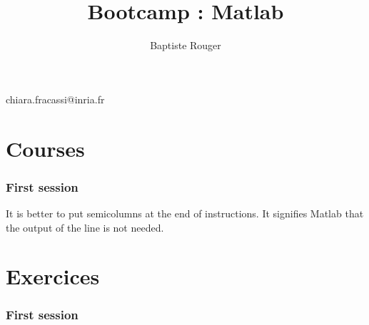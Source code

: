 \documentclass[10pt,a4paper]{article}
\author{Baptiste Rouger}
\title{Bootcamp : Matlab}
\begin{document}
\maketitle

\begin{flushright}
chiara.fracassi@inria.fr
\end{flushright}

\tableofcontents

\newpage

\part{Courses}
\section{First session}

It is better to put semicolumns at the end of instructions. It signifies Matlab that the output of the line is not needed.




\part{Exercices}
\section{First session}


\end{document}
